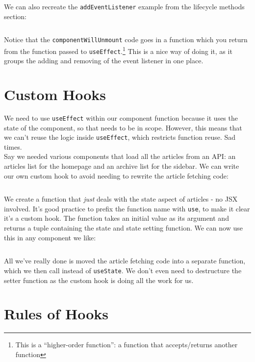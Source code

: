 \inputminted{javascript}{05-hooks/figures/11-StarWarsFolks.js}


We can also recreate the \texttt{addEventListener} example from the lifecycle methods section:


\inputminted{javascript}{05-hooks/figures/12-useEffect-return.js}

Notice that the \texttt{componentWillUnmount} code goes in a function which you return from the function passed to \texttt{useEffect}.\footnote{This is a ``higher-order function'': a function that accepts/returns another function} This is a nice way of doing it, as it groups the adding and removing of the event listener in one place.


\section{Custom Hooks}

We need to use \texttt{useEffect} within our component function because it uses the state of the component, so that needs to be in scope. However, this means that we can't reuse the logic inside \texttt{useEffect}, which restricts function reuse. Sad times.
\\

Say we needed various components that load all the articles from an API: an articles list for the homepage and an archive list for the sidebar. We can write our own custom hook to avoid needing to rewrite the article fetching code:

\inputminted{js}{05-hooks/figures/13-useGetArticles.js}

We create a function that \textit{just} deals with the state aspect of articles - no JSX involved. It's good practice to prefix the function name with \texttt{use}, to make it clear it's a custom hook. The function takes an initial value as its argument and returns a tuple containing the state and state setting function. We can now use this in any component we like:

\inputminted{js}{05-hooks/figures/14-Articles.js}

All we've really done is moved the article fetching code into a separate function, which we then call instead of \texttt{useState}. We don't even need to destructure the setter function as the custom hook is doing all the work for us.

\section{Rules of Hooks}

